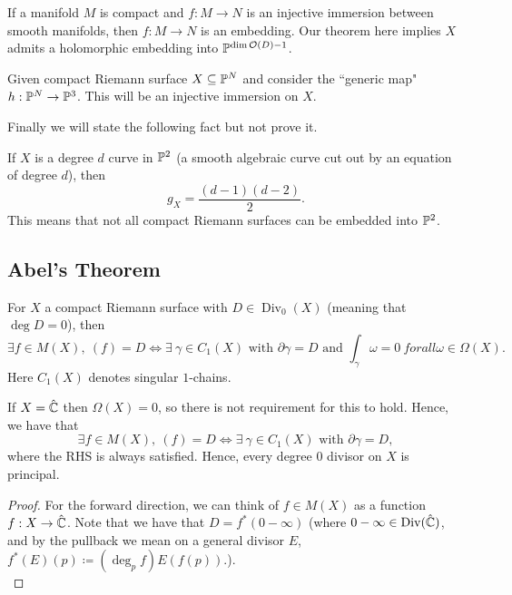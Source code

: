 \documentclass{article}
\begin{document}
{\begin{remark}
    If a manifold $M$ is compact and $f: M \to N$ is an injective immersion between smooth manifolds, then $f: M \to N$ is an embedding. Our theorem here implies $X$ admits a holomorphic embedding into $\mathbb{P}^{\dim \mathcal{O}(D) - 1}$.
\end{remark}

\begin{exercise}
    Given compact Riemann surface $X \subseteq \mathbb{P}^N$ and consider the ``generic map" $h: \mathbb{P}^N \to \mathbb{P}^3$. This will be an injective immersion on $X$.
\end{exercise}

Finally we will state the following fact but not prove it.
\begin{definition}
    If $X$ is a degree $d$ curve in $\mathbb{P}^2$ (a smooth algebraic curve cut out by an equation of degree $d$), then
    \[g_X = \frac{(d-1)(d-2)}{2}.\]
    This means that not all compact Riemann surfaces can be embedded into $\mathbb{P}^2$.
\end{definition}

\subsection{Abel's Theorem}

\begin{theorem}
    For $X$ a compact Riemann surface with $D \in \operatorname{Div}_0(X)$ (meaning that $\deg D = 0$), then
    \[\exists f \in M(X),\ (f) = D \iff \exists\ \gamma \in C_1(X) \text{ with } \partial \gamma = D \text{ and } \int_\gamma \omega = 0\ forall \omega \in \Omega(X). \]
    Here $C_1(X)$ denotes singular $1$-chains.
\end{theorem}

\begin{remark}
    If $X = \hat{\mathbb{C}}$ then $\Omega(X) = 0$, so there is not requirement for this to hold. Hence, we have that
    \[\exists f \in M(X),\ (f) = D \iff  \exists\ \gamma \in C_1(X) \text{ with } \partial \gamma = D,\]
    where the RHS is always satisfied. Hence, every degree $0$ divisor on $X$ is principal.
\end{remark}

\begin{proof}
    For the forward direction, we can think of $f \in M(X)$ as a function $f: X \to \hat{\mathbb{C}}$. Note that we have that $D = f^*(0 - \infty)$ (where $0 - \infty \in \operatorname{Div}(\hat{\mathbb{C}})$, and by the pullback we mean on a general divisor $E$,  $f^*(E)(p) \coloneqq (\deg_p f) E(f(p))$.).\\


\end{proof}}
\end{document}
